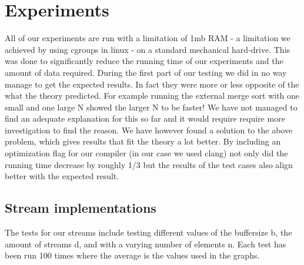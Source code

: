 \section{Experiments}

All of our experiments are run with a limitation of 1mb RAM - a limitation we achieved by using cgroups in linux - on a standard mechanical hard-drive. This was done to significantly reduce the running time of our experiments and the amount of data required. 
During the first part of our testing we did in no way manage to get the expected results. In fact they were more or less opposite of the what the theory predicted. For example running the external merge sort with one small and one large N showed the larger N to be faster! We have not managed to find an adequate explanation for this so far and it would require require more investigation to find the reason.
We have however found a solution to the above problem, which gives results that fit the theory a lot better. By including an optimization flag for our compiler (in our case we used clang) not only did the running time decrease by roughly 1/3 but the results of the test cases also align better with the expected result. 

\subsection{Stream implementations}
The tests for our streams include testing different values of the buffersize b, the amount of streams d, and with a varying number of elements n. 
Each test has been run 100 times where the average is the values used in the graphs. 

